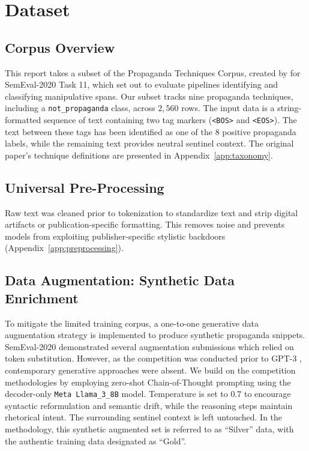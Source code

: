 \documentclass[12pt, a4paper]{article}
\begin{document}
\section{Dataset}
\label{sec:dataset}

\subsection{Corpus Overview}
\label{subsec:corpus_overview}

This report takes a subset of the Propaganda Techniques Corpus, created by \cite{dasan2020} for SemEval-2020 Task 11, which set out to evaluate pipelines identifying and classifying manipulative spans. Our subset tracks nine propaganda techniques, including a \texttt{not\_propaganda} class, across $2,560$ rows. The input data is a string-formatted sequence of text containing two tag markers (\texttt{<BOS>} and \texttt{<EOS>}). The text between these tags has been identified as one of the 8 positive propaganda labels, while the remaining text provides neutral sentinel context. The original paper's technique definitions are presented in Appendix~\ref{app:taxonomy}.

\subsection{Universal Pre-Processing}
\label{subsec:preprocessing}

Raw text was cleaned prior to tokenization to standardize text and strip digital artifacts or publication-specific formatting. This removes noise and prevents models from exploiting publisher-specific stylistic backdoors (Appendix~\ref{app:preprocessing}).

\subsection{Data Augmentation: Synthetic Data Enrichment}
\label{subsec:data_augmentation}

To mitigate the limited training corpus, a one-to-one generative data augmentation strategy is implemented to produce synthetic propaganda snippets. SemEval-2020 demonstrated several augmentation submissions \cite{kranzlein2020} which relied on token substitution. However, as the competition was conducted prior to GPT-3 \cite{brown2020}, contemporary generative approaches were absent. We build on the competition methodologies by employing zero-shot Chain-of-Thought prompting \cite{kojima2022, wei2022} using the decoder-only \texttt{Meta Llama\_3\_8B} model. Temperature is set to $0.7$ to encourage syntactic reformulation and semantic drift, while the reasoning steps maintain rhetorical intent. The surrounding sentinel context is left untouched. In the methodology, this synthetic augmented set is referred to as ``Silver'' data, with the authentic training data designated as ``Gold''.
\end{document}

